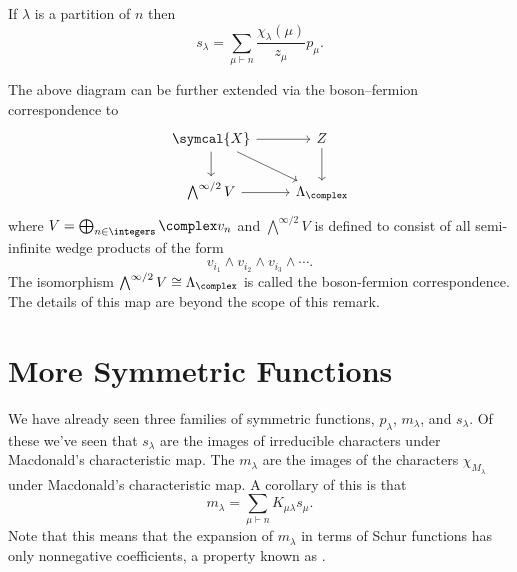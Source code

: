\documentclass[fleqn]{NotesClass}
\newcommand{\isomorphic}{\cong}
\newcommand{\classFunctions}{\symcal{X}}
\newcommand{\partition}{\vdash}
\begin{document}
    \begin{crl}{}{}
        If \(\lambda\) is a partition of \(n\) then
        \begin{equation}
            s_\lambda = \sum_{\mu \partition n} \frac{\chi_\lambda(\mu)}{z_\mu} p_\mu.
        \end{equation}
    \end{crl}
    
    \begin{remark}{}{}
        The above diagram can be further extended via the boson--fermion correspondence to
        \begin{equation}
            \begin{tikzcd}
                \classFunctions \arrow[r] \arrow[dr] \arrow[d] & Z \arrow[d]\\
                \bigwedge^{\infty/2} V \arrow[r] & \Lambda_{\complex}
            \end{tikzcd}
        \end{equation}
        where \(V = \bigoplus_{n \in \integers} \complex v_n\) and \(\bigwedge^{\infty/2}V\) is defined to consist of all semi-infinite wedge products of the form
        \begin{equation}
            v_{i_1} \wedge v_{i_2} \wedge v_{i_3} \wedge \dotsb.
        \end{equation}
        The isomorphism \(\bigwedge^{\infty/2}V \isomorphic \Lambda_{\complex}\) is called the boson-fermion correspondence.
        The details of this map are beyond the scope of this remark.
    \end{remark}
    
    \section{More Symmetric Functions}
    We have already seen three families of symmetric functions, \(p_\lambda\), \(m_\lambda\), and \(s_\lambda\).
    Of these we've seen that \(s_\lambda\) are the images of irreducible characters under Macdonald's characteristic map.
    The \(m_\lambda\) are the images of the characters \(\chi_{M_\lambda}\) under Macdonald's characteristic map.
    A corollary of this is that
    \begin{equation}
        m_\lambda = \sum_{\mu \partition n} K_{\mu\lambda} s_\mu.
    \end{equation}
    Note that this means that the expansion of \(m_\lambda\) in terms of Schur functions has only nonnegative coefficients, a property known as .
    
\end{document}
